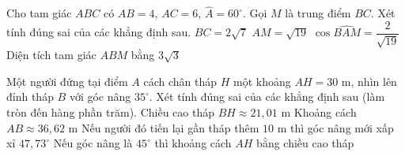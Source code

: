 \begin{ex}%
	Cho tam giác $ABC$ có $AB=4$, $AC=6$, $\widehat{A}=60^\circ$. Gọi $M$ là trung điểm $BC$. Xét tính đúng sai của các khẳng định sau.
	\choiceTF
		{\True $BC=2\sqrt7$}
		{\True $AM=\sqrt{19}$}
		{\True $\cos\widehat{BAM}=\dfrac{2}{\sqrt{19}}$}
		{Diện tích tam giác $ABM$ bằng $3\sqrt3$}
\end{ex}

\begin{ex}%
	Một người đứng tại điểm $A$ cách chân tháp $H$ một khoảng $AH=30$ m, nhìn lên đỉnh tháp $B$ với góc nâng $35^\circ$. Xét tính đúng sai của các khẳng định sau (làm tròn đến hàng phần trăm).
	\choiceTF
		{\True Chiều cao tháp $BH\approx 21{,}01$ m}
		{\True Khoảng cách $AB\approx 36{,}62$ m}
		{Nếu người đó tiến lại gần tháp thêm $10$ m thì góc nâng mới xấp xỉ $47{,}73^\circ$}
		{\True Nếu góc nâng là $45^\circ$ thì khoảng cách $AH$ bằng chiều cao tháp}
\end{ex}

